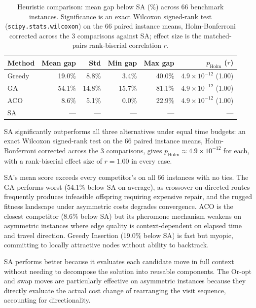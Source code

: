 \documentclass[11pt,a4paper]{article}
\begin{document}
\begin{table}[H]
\centering
\caption{Heuristic comparison: mean gap below SA (\%) across 66 benchmark instances. Significance is an exact Wilcoxon signed-rank test (\texttt{scipy.stats.wilcoxon}) on the 66 paired instance means, Holm-Bonferroni corrected across the 3 comparisons against SA; effect size is the matched-pairs rank-biserial correlation $r$.}
\label{tab:heuristic_comparison}
\begin{tabular}{lrrrrr}
\toprule
\textbf{Method} & \textbf{Mean gap} & \textbf{Std} & \textbf{Min gap} & \textbf{Max gap} & \textbf{$p_{\text{Holm}}$ ($r$)} \\
\midrule
Greedy  & 19.0\% &  8.8\% &  3.4\% & 40.0\% & $4.9\times10^{-12}$ (1.00) \\
GA      & 54.1\% & 14.8\% & 15.7\% & 81.1\% & $4.9\times10^{-12}$ (1.00) \\
ACO     &  8.6\% &  5.1\% &  0.0\% & 22.9\% & $4.9\times10^{-12}$ (1.00) \\
SA      &  ---   & ---    &  ---   & ---    & --- \\
\bottomrule
\end{tabular}
\end{table}

SA significantly outperforms all three alternatives under equal time budgets: an exact Wilcoxon signed-rank test on the 66 paired instance means, Holm-Bonferroni corrected across the 3 comparisons, gives $p_{\text{Holm}} \approx 4.9\times10^{-12}$ for each, with a rank-biserial effect size of $r = 1.00$ in every case.

SA's mean score exceeds every competitor's on all 66 instances with no ties.
The GA performs worst (54.1\% below SA on average), as crossover on directed routes frequently produces infeasible offspring requiring expensive repair, and the rugged fitness landscape under asymmetric costs degrades convergence.
ACO is the closest competitor (8.6\% below SA) but its pheromone mechanism weakens on asymmetric instances where edge quality is context-dependent on elapsed time and travel direction.
Greedy Insertion (19.0\% below SA) is fast but myopic, committing to locally attractive nodes without ability to backtrack.

SA performs better because it evaluates each candidate move in full context without needing to decompose the solution into reusable components.
The Or-opt and swap moves are particularly effective on asymmetric instances because they directly evaluate the actual cost change of rearranging the visit sequence, accounting for directionality.
\end{document}

